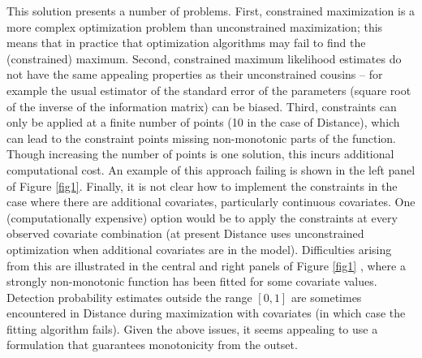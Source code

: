 \documentclass[useAMS,referee,usenatbib]{biom}
\begin{document}
This solution presents a number of problems. First, constrained maximization is a more complex optimization problem than unconstrained maximization; this means that in practice that optimization algorithms may fail to find the (constrained) maximum.  Second, constrained maximum likelihood estimates do not have the same appealing properties as their unconstrained cousins -- for example the usual estimator of the standard error of the parameters (square root of the inverse of the information matrix) can be biased.  Third, constraints can only be applied at a finite number of points (10 in the case of Distance), which can lead to the constraint points missing non-monotonic parts of the function. Though increasing the number of points is one solution, this incurs additional computational cost. An example of this approach failing is shown in the left panel of Figure \ref{fig1}. Finally, it is not clear how to implement the constraints in the case where there are additional covariates, particularly continuous covariates. One (computationally expensive) option would be to apply the constraints at every observed covariate combination (at present Distance uses unconstrained optimization when additional covariates are in the model). Difficulties arising from this are illustrated in the central and right panels of Figure \ref{fig1} \citep[from][]{Pike:2003ug}, where a strongly non-monotonic function has been fitted for some covariate values. Detection probability estimates outside the range $[0,1]$ are sometimes encountered in Distance during maximization with covariates (in which case the fitting algorithm fails). Given the above issues, it seems appealing to use a formulation that guarantees monotonicity from the outset.
\end{document}
